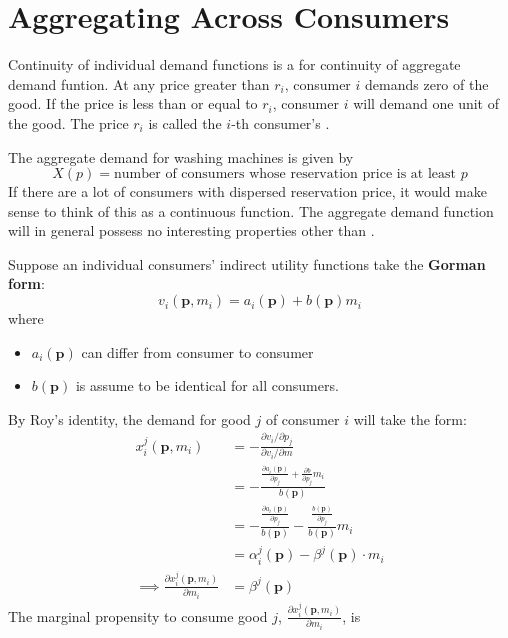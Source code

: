 \section{Aggregating Across Consumers}

Continuity of individual demand functions is a  for continuity of aggregate demand funtion. 
At any price greater than \( r_i \), consumer \( i \) demands zero of the good.
If the price is less than or equal to \( r_i \), consumer \( i \) will demand one unit of the good. 
The price \( r_i \) is called the \( i \)-th consumer's . 

The aggregate demand for washing machines is given by 
\[
    X(p) = \text{number of consumers whose reservation price is at least $p$}
\]
If there are a lot of consumers with dispersed reservation price, it would make sense to think of this as a continuous function.
The aggregate demand function will in general possess no interesting properties other than .

Suppose an individual consumers' indirect utility functions take the \textbf{Gorman form}:
\[
    v_i(\mathbf p, m_i) = a_i(\mathbf{p}) + b(\mathbf{p}) m_i
\]
where 
\begin{itemize}
    \item \( a_i(\mathbf{p}) \) can differ from consumer to consumer
    \item \( b(\mathbf{p}) \) is assume to be identical for all consumers.
\end{itemize}
By Roy's identity, the demand for good \( j \) of consumer \( i \) will take the form:
\begin{align*}
    x_i^j(\mathbf{p}, m_i) &= -\frac{ \partial v_i / \partial p_j}{ \partial v_i / \partial m} \\
    &= -\frac{
        \frac{\partial a_i(\mathbf{p})}{ \partial p_j } + \frac{ \partial b }{ \partial p_j} m_i
    }{b(\mathbf{p})} \\
    &= -\frac{ \frac{\partial a_i(\mathbf{p})}{ \partial p_j } }{ b(\mathbf{p}) } - \frac{ \frac{b(\mathbf{p})}{ \partial p_j } }{ b(\mathbf{p}) } m_i \\
    &= \alpha_i^j(\mathbf{p}) - \beta^j(\mathbf{p}) \cdot m_i \\
    \implies \frac{ \partial x_i^j(\mathbf{p}, m_i) }{ \partial m_i } &= \beta^j(\mathbf{p})
\end{align*}
The marginal propensity to consume good \( j \), \( \frac{ \partial x_i^j(\mathbf{p}, m_i) }{ \partial m_i } \), is 

